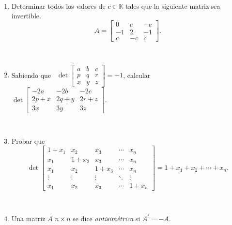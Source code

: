 \documentclass[12pt]{amsart}
\begin{document}
\begin{enumerate}[resume]
\item Determinar todos los valores de $c\in\mathbb{K}$ tales que la siguiente matriz sea invertible.
$$A=\begin{bmatrix} 0&c&-c\\ -1&2&-1\\c&-c&c\end{bmatrix}.$$

%		

\

\item Sabiendo que \
$
\det \begin{bmatrix} a&b&c\\ p&q&r\\
x&y&z\end{bmatrix}=-1
$,
calcular \
$
\det \begin{bmatrix} -2a&-2b&-2c\\ 2p+x&2q+y&2r+z\\
3x&3y&3z\end{bmatrix}.
$

\

\item Probar que
$$
\det\begin{bmatrix}
1+x_1 & x_2 & x_3 & \cdots & x_n \\
x_1 & 1+x_2 & x_3 & \cdots & x_n \\
x_1 & x_2 & 1+x_3 & \cdots & x_n \\
\vdots & \vdots & \vdots &\ddots& \vdots \\
x_1 & x_2 & x_3 & \cdots & 1+x_n
\end{bmatrix}
= 1+x_1+x_2 + \cdots + x_n.
$$

\

\item
Una matriz $A$ $n \times n$ se dice {\it antisim\'etrica}
si $A^t=-A$.


\end{enumerate}
\end{document}
